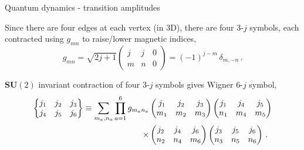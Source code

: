 \documentclass[12pt,titlepage]{article}
\begin{document}
\begin{frame}{Quantum dynamics - transition amplitudes}
    \begin{list}{\,}{\leftmargin=1em \itemindent=0em}
        \vspace{-2pt}
        \item<1-> Since there are four edges at each vertex (in 3D), there are four 3-$j$ symbols, each contracted using $g_{mn}$ to raise/lower magnetic indices,
        \begin{equation}
            g_{mn}=\sqrt{2j+1}
            \begin{pmatrix}
                j & j & 0 \\
                m & n & 0
            \end{pmatrix}
            =(-1)^{j-m}\,\delta_{m,-n}\,.
        \end{equation}
        \vspace{-7pt}
        \item<2-> $\mathbf{SU}(2)$ invariant contraction of four 3-$j$ symbols gives Wigner 6-$j$ symbol,
        \begin{align}
            \begin{Bmatrix}
                j_1 & j_2 & j_3 \\
                j_4 & j_5 & j_6
            \end{Bmatrix}
            \equiv\sum_{m_a,n_a}\prod_{a=1}^{6} g_{m_an_a}&
            \begin{pmatrix}
                j_1 & j_2 & j_3 \\
                m_1 & m_2 & m_3
            \end{pmatrix}
            \begin{pmatrix}
                j_1 & j_4 & j_5 \\
                n_1 & m_4 & m_5
            \end{pmatrix}\notag\\
            \times&
            \begin{pmatrix}
                j_2 & j_4 & j_6 \\
                n_2 & n_4 & m_6
            \end{pmatrix}
            \begin{pmatrix}
                j_3 & j_5 & j_6 \\
                n_3 & n_5 & n_6
            \end{pmatrix}\,.
        \end{align}
        \vspace{-6pt}

\end{list}
\end{frame}
\end{document}
